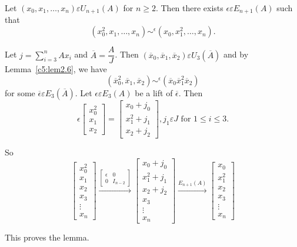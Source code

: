 \begin{lem}\label{c5:lem2.9}
Let $(x_0,x_1,\ldots,x_n)\varepsilon U_{n+1}(A)$ for $n\geq 2$. Then
there exists $\epsilon \varepsilon E_{n+1}(A)$ such that 
$$
\left(x^{2}_0,x_1,\ldots,x_n\right)\displaystyle\mathop{\sim}^{\epsilon}\left(x_0,x^{2}_1,\ldots,x_n\right).
$$
\end{lem}

\begin{Proof}
Let $j=\sum\limits_{i=3}^{n}Ax_i$ and
$\overline{A}=\dfrac{A}{J}$. Then
$\left(\overline{x}_0,\overline{x}_1,\overline{x}_2\right)\varepsilon
U_3(\overline{A})$ and by Lemma~\ref{c5:lem2.6}, we have 
$$
\left(\overline{x}^{2}_0,\overline{x}_1,\overline{x}_2\right)\displaystyle\mathop{\sim}^{\epsilon} \left(\overline{x}_0\overline{x}^{2}_1\overline{x}_2\right)
$$
for some $\overline{\epsilon}\varepsilon E_3(\overline{A})$. Let
$\epsilon \varepsilon E_3(A)$ be a lift of $\overline{\epsilon}$. Then 
$$
\epsilon
\begin{bmatrix}
x^{2}_0\\
x_1\\
x_2
\end{bmatrix} = \begin{bmatrix}
x_0+j_0\\
x^{2}_1+j_1\\
x_2+j_2
\end{bmatrix}, j_1\varepsilon J \text{ for } 1\leq i\leq 3.
$$

So
$$
\begin{bmatrix}
x^{2}_0\\
x_1\\
x_2\\
x_3\\
\vdots\\
x_n
\end{bmatrix}\xrightarrow{\begin{bmatrix}
\epsilon & 0\\
0 &I_{n-2}
  \end{bmatrix}
} \begin{bmatrix}
x_0+j_0\\
x^{2}_1+j_1\\
x_2+j_2\\
x_3\\
\vdots\\
x_n
\end{bmatrix}\xrightarrow{E_{n+1}(A)} \begin{bmatrix}
x_0\\
x^{2}_1\\
x_2\\
x_3\\
\vdots\\
x_n
\end{bmatrix}
$$

This proves the lemma.
\enprf
\end{Proof}

